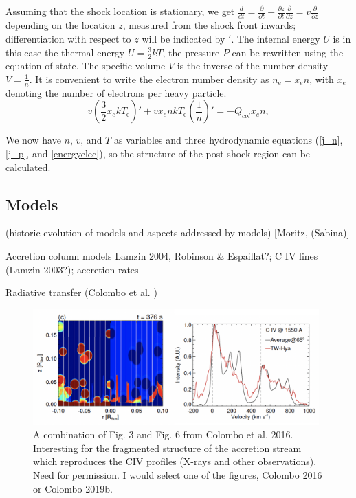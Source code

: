 Assuming that the shock location is stationary, we get $\frac{d}{dt}=\frac{\partial}{\partial t}+\frac{\partial z}{\partial t}\frac{\partial}{\partial z}=v\frac{\partial}{\partial z}$ depending on the location $z$, measured from the shock front inwards; differentiation with respect to $z$ will be indicated by $'$.
The internal energy $U$ is in this case the thermal energy $U=\frac{3}{2}kT$, the pressure $P$ can be rewritten using the equation of state. The specific volume $V$ is the inverse of the number density $V=\frac{1}{n}$. 
It is convenient to write the electron number density as \mbox{$n_{\mathrm{e}}=x_e n$,} with $x_e$ denoting the number of electrons per heavy particle.
\begin{equation}
\label{energyelec}
v\left(\frac{3}{2}x_e k T_{\mathrm{e}}\right)'+v x_e n k T_{\mathrm{e}} \left(\frac{1}{n}\right)'=-Q_{col} x_e n,
\end{equation} 

We now have $n$, $v$, and $T$ as variables and three hydrodynamic equations (\ref{j_n}, \ref{j_p}, and \ref{energyelec}), so the structure of the post-shock region can be calculated.


\subsection{Models}

\label{sect:accretionmodels}
{\color{blue}(historic evolution of models and aspects addressed by models) [Moritz, (Sabina)]

Accretion column models Lamzin 2004, Robinson & Espaillat?; C IV lines (Lamzin 2003?); accretion rates



Radiative transfer (Colombo et al. )


}

\begin{figure}
    \centering
    \includegraphics[width=11cm]{figs/colombo2016.png}
    \caption{A combination of Fig. 3 and Fig. 6 from Colombo et al. 2016. Interesting for the fragmented structure of the accretion stream which reproduces the CIV profiles (X-rays and other observations). Need for permission. I would select one of the figures, Colombo 2016 or Colombo 2019b.}
    \label{fig:colombo2016}
\end{figure}

